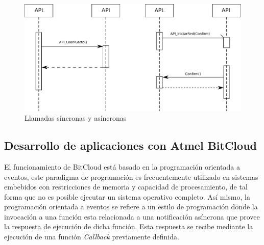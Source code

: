 

\begin{figure}
	\centering
	\includegraphics[scale=0.7]{capitulo_2_imgs/event-driven.pdf}
	\caption{Llamadas síncronas y asíncronas}
	\label{fig:event_driven}
\end{figure}

\subsection{Desarrollo de aplicaciones con Atmel BitCloud}

El funcionamiento de BitCloud está basado en la programación orientada a eventos, este paradigma de programación es frecuentemente utilizado en sistemas embebidos con restricciones de memoria y capacidad de procesamiento, de tal forma que no es posible ejecutar un sistema operativo completo. Así mismo, la programación orientada a eventos se refiere a un estilo de programación donde la invocación a una función esta relacionada a una notificación asíncrona que provee la respuesta de ejecución de dicha función. Esta respuesta se recibe mediante la ejecución de una función \textit{Callback} previamente definida. 

